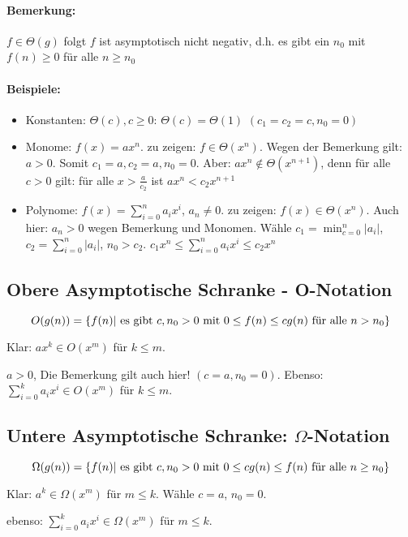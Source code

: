 \documentclass[a4paper]{scrartcl}
\begin{document}
\paragraph{Bemerkung:} $f\in\Theta(g)$ folgt $f$ ist asymptotisch nicht negativ, d.h. es gibt ein $n_0$ mit $f(n)\ge0$ für alle $n\ge n_0$

\paragraph{Beispiele:}
\begin{itemize}
\item Konstanten: $\Theta(c), c\ge 0$: $\Theta(c) = \Theta(1)$ $(c_1=c_2=c,n_0=0)$
\item Monome:  $f(x) = ax^n$. zu zeigen: $f\in\Theta(x^n)$. Wegen der Bemerkung gilt: $a>0$. Somit $c_1 = a, c_2=a, n_0=0$. Aber: $ax^n \notin \Theta(x^{n+1})$, denn für alle $c>0$ gilt: für alle $x>\frac{a}{c_2}$ ist $ax^n < c_2x^{n+1}$
\item Polynome: $f(x) = \sum_{i=0}^na_ix^i$, $a_n\ne0$. zu zeigen: $f(x) \in \Theta(x^n)$. Auch hier: $a_n>0$ wegen Bemerkung und Monomen. Wähle $c_1=\min_{c=0}^n|a_i|$, $c_2=\sum_{i=0}^n|a_i|$, $n_0>c_2$. $c_1x^n\le \sum_{i=0}^{n}a_ix^i\le c_2x^n$
\end{itemize}

\subsection{Obere Asymptotische Schranke - O-Notation}

$$ O(g(n))=\{f(n)| \textnormal{ es gibt } c,n_0>0 \textnormal{ mit } 0 \leq f(n) \leq cg(n) \textnormal{ für alle } n>n_0 \} $$

Klar: $ax^k\in O(x^m) $ für $k\le m$.

$a>0$, Die Bemerkung gilt auch hier! $(c=a,n_0=0)$. Ebenso: $\sum_{i=0}^ka_ix^i\in O(x^m)$ für $k\le m$.

\subsection{Untere Asymptotische Schranke: $\Omega$-Notation}

$$ \Omega(g(n))=\{f(n)| \textnormal{ es gibt } c,n_0>0 \textnormal{ mit } 0 \leq cg(n)\leq f(n) \textnormal{ für alle } n \geq n_0 \} $$

Klar: $a^k\in\Omega(x^m)$ für $m\le k$. Wähle $c=a$, $n_0=0$.

ebenso: $\sum_{i=0}^ka_ix^i\in\Omega(x^m)$ für $m\le k$.
\end{document}
